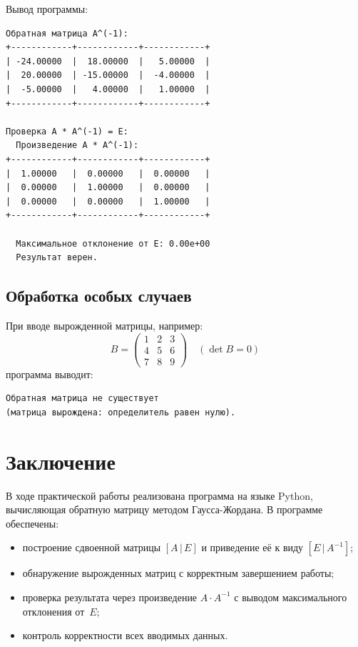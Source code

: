 \documentclass[12pt,a4paper]{scrartcl}
\begin{document}
Вывод программы:

\begin{verbatim}
Обратная матрица A^(-1):
+------------+------------+------------+
| -24.00000  |  18.00000  |   5.00000  |
|  20.00000  | -15.00000  |  -4.00000  |
|  -5.00000  |   4.00000  |   1.00000  |
+------------+------------+------------+

Проверка A * A^(-1) = E:
  Произведение A * A^(-1):
+------------+------------+------------+
|  1.00000   |  0.00000   |  0.00000   |
|  0.00000   |  1.00000   |  0.00000   |
|  0.00000   |  0.00000   |  1.00000   |
+------------+------------+------------+

  Максимальное отклонение от E: 0.00e+00
  Результат верен.
\end{verbatim}

\subsection{Обработка особых случаев}

При вводе вырожденной матрицы, например:
\[
    B =
    \begin{pmatrix}
        1 & 2 & 3 \\
        4 & 5 & 6 \\
        7 & 8 & 9
    \end{pmatrix}
    \quad (\det B = 0)
\]
программа выводит:
\begin{verbatim}
Обратная матрица не существует
(матрица вырождена: определитель равен нулю).
\end{verbatim}

\section{Заключение}

В ходе практической работы реализована программа на языке Python,
вычисляющая обратную матрицу методом Гаусса-Жордана. В программе обеспечены:

\begin{itemize}
    \item построение сдвоенной матрицы $[A\,|\,E]$ и приведение её к виду $[E\,|\,A^{-1}]$;
    \item обнаружение вырожденных матриц с корректным завершением работы;
    \item проверка результата через произведение $A \cdot A^{-1}$
          с выводом максимального отклонения от~$E$;
    \item контроль корректности всех вводимых данных.
\end{itemize}
\end{document}
